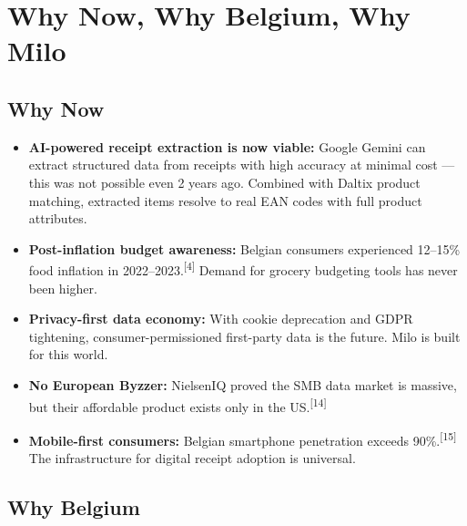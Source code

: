 \documentclass[11pt,a4paper]{article}
\begin{document}
\clearpage

\section{Why Now, Why Belgium, Why Milo}

\subsection{Why Now}

\begin{itemize}[leftmargin=1.5em, itemsep=4pt]
  \item \textbf{AI-powered receipt extraction is now viable:} Google Gemini can extract structured data from receipts with high accuracy at minimal cost --- this was not possible even 2 years ago. Combined with Daltix product matching, extracted items resolve to real EAN codes with full product attributes.
  \item \textbf{Post-inflation budget awareness:} Belgian consumers experienced 12--15\% food inflation in 2022--2023.\textsuperscript{[4]} Demand for grocery budgeting tools has never been higher.
  \item \textbf{Privacy-first data economy:} With cookie deprecation and GDPR tightening, consumer-permissioned first-party data is the future. Milo is built for this world.
  \item \textbf{No European Byzzer:} NielsenIQ proved the SMB data market is massive, but their affordable product exists only in the US.\textsuperscript{[14]}
  \item \textbf{Mobile-first consumers:} Belgian smartphone penetration exceeds 90\%.\textsuperscript{[15]} The infrastructure for digital receipt adoption is universal.
\end{itemize}

\subsection{Why Belgium}
\end{document}
